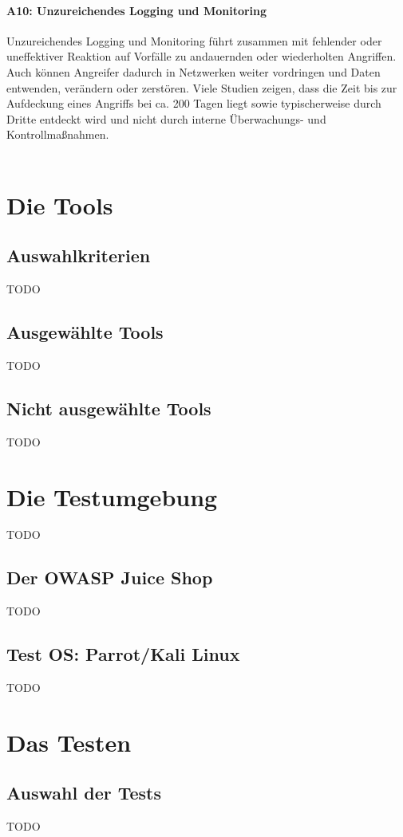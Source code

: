 \documentclass[12pt,oneside,a4paper,parskip]{scrbook}
\begin{document}
\subsubsection{A10: Unzureichendes Logging und Monitoring}
Unzureichendes Logging und Monitoring führt zusammen mit fehlender oder uneffektiver
Reaktion auf Vorfälle zu andauernden oder wiederholten Angriffen. Auch können Angreifer
dadurch in Netzwerken weiter vordringen und Daten entwenden, verändern oder zerstören.
Viele Studien zeigen, dass die Zeit bis zur Aufdeckung eines Angriffs bei ca. 200 Tagen
liegt sowie typischerweise durch Dritte entdeckt wird und nicht durch interne
Überwachungs- und Kontrollmaßnahmen.\\
\\
\cite{OWASPtop10}

\chapter{Die Tools}
\section{Auswahlkriterien}
TODO
\section{Ausgewählte Tools}
TODO
\section{Nicht ausgewählte Tools}
TODO

\chapter{Die Testumgebung}
TODO
\section{Der OWASP Juice Shop}
TODO
\section{Test OS: Parrot/Kali Linux}
TODO

\chapter{Das Testen}
\section{Auswahl der Tests}
TODO
\end{document}
